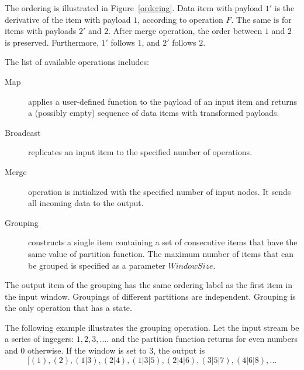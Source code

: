 The ordering is illustrated  in Figure~\ref{ordering}. Data item with payload $1'$ is the derivative of the item with payload $1$, according to operation $F$. The same is for items with payloads $2'$ and $2$. After merge operation, the order between $1$ and $2$ is preserved. Furthermore, $1'$ follows $1$, and $2'$ follows $2$.  



The list of available operations includes:
\begin {description}
\item [Map] applies a user-defined function to the payload of an input item and returns a (possibly empty) sequence of data items with transformed payloads. 

\item [Broadcast] replicates an input item to the specified number of operations.

\item [Merge] operation is initialized with the specified number of input nodes. It sends all incoming data to the output.

\item [Grouping] constructs a single item containing a set of consecutive items that have the same value of partition function. The maximum number of items that can be grouped is specified as a parameter  $Window Size.$ 
\end {description}

The output item of the grouping has the same ordering label as the first item in the input window. 
Groupings of different partitions are independent. 
Grouping is the only operation that has a state.


The following example illustrates  the grouping operation. 
Let the input stream be a series of ingegers: $ 1,2,3, \ldots.$ and the  partition function returns for even numbers and 0 otherwise. If the window is set to 3, the output is 
$$ [(1), (2), (1|3), (2|4), (1|3|5), (2|4|6), (3|5|7), (4|6|8), \ldots$$


